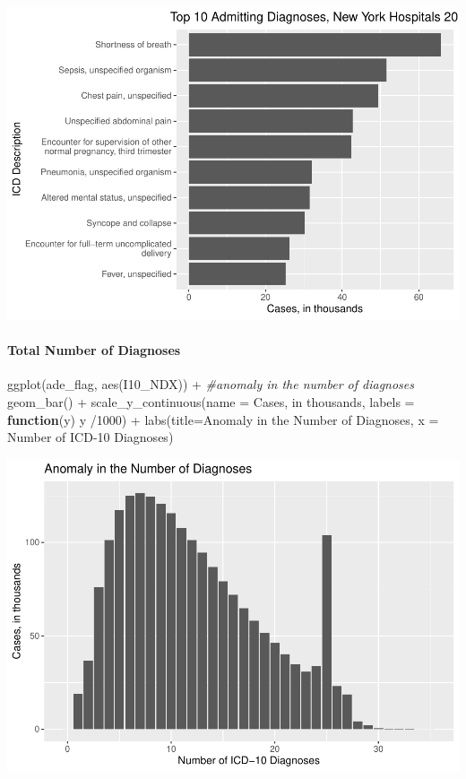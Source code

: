 \documentclass[preprint, 3p,
authoryear]{elsarticle} %
\newenvironment{Shaded}{\begin{snugshade}}{\end{snugshade}}
\newcommand{\AttributeTok}[1]{\textcolor[rgb]{0.77,0.63,0.00}{#1}}
\newcommand{\CommentTok}[1]{\textcolor[rgb]{0.56,0.35,0.01}{\textit{#1}}}
\newcommand{\ControlFlowTok}[1]{\textcolor[rgb]{0.13,0.29,0.53}{\textbf{#1}}}
\newcommand{\DecValTok}[1]{\textcolor[rgb]{0.00,0.00,0.81}{#1}}
\newcommand{\FunctionTok}[1]{\textcolor[rgb]{0.00,0.00,0.00}{#1}}
\newcommand{\NormalTok}[1]{#1}
\newcommand{\SpecialCharTok}[1]{\textcolor[rgb]{0.00,0.00,0.00}{#1}}
\newcommand{\StringTok}[1]{\textcolor[rgb]{0.31,0.60,0.02}{#1}}
\begin{document}
\includegraphics{final-project-paper_files/figure-latex/dx-admitting-1.pdf}

\hypertarget{total-number-of-diagnoses}{%
\paragraph{Total Number of Diagnoses}\label{total-number-of-diagnoses}}

\begin{Shaded}
\begin{Highlighting}[]
\FunctionTok{ggplot}\NormalTok{(ade\_flag, }\FunctionTok{aes}\NormalTok{(I10\_NDX)) }\SpecialCharTok{+} \CommentTok{\#anomaly in the number of diagnoses}
  \FunctionTok{geom\_bar}\NormalTok{() }\SpecialCharTok{+}
    \FunctionTok{scale\_y\_continuous}\NormalTok{(}\AttributeTok{name =} \StringTok{\textquotesingle{}Cases, in thousands\textquotesingle{}}\NormalTok{, }\AttributeTok{labels =} \ControlFlowTok{function}\NormalTok{(y) y }\SpecialCharTok{/}\DecValTok{1000}\NormalTok{) }\SpecialCharTok{+}
  \FunctionTok{labs}\NormalTok{(}\AttributeTok{title=}\StringTok{\textquotesingle{}Anomaly in the Number of Diagnoses\textquotesingle{}}\NormalTok{, }\AttributeTok{x =} \StringTok{\textquotesingle{}Number of ICD{-}10 Diagnoses\textquotesingle{}}\NormalTok{) }
\end{Highlighting}
\end{Shaded}

\includegraphics{final-project-paper_files/figure-latex/n-dx-plot-1.pdf}
\end{document}
